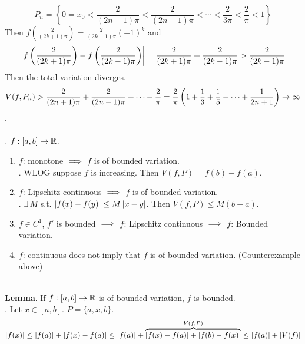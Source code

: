 $$P_n = \left\{0 = x_0 <\frac{2}{(2n+1)\pi} <\frac{2}{(2n-1)\pi} < \cdots < \frac{2}{3\pi} < \frac{2}{\pi} < 1 \right\}$$
Then $f(\frac{2}{(2k+1)\pi}) = \frac{2}{(2k+1)\pi} (-1)^k$ and $$\left|f\left(\frac{2}{(2k+1)\pi}\right) - f\left(\frac{2}{(2k-1)\pi}\right)\right| = \frac{2}{(2k+1)\pi} + \frac{2}{(2k-1)\pi} > \frac{2}{(2k-1)\pi}$$
Then the total variation diverges. $$V(f, P_n) > \frac{2}{(2n+1)\pi} + \frac{2}{(2n-1)\pi} + \cdots + \frac{2}{\pi} = \frac{2}{\pi} \left(1+\frac{1}{3} + \frac{1}{5} + \cdots + \frac{1}{2n+1}\right) \rightarrow \infty$$.\\
\\
\ex. $f:[a, b]\rightarrow\mathbb{R}$.
\begin{enumerate}
	\item $f$: monotone $\implies$ $f$ is of bounded variation.\\
	\pf. WLOG suppose $f$ is increasing. Then $V(f, P) = f(b)-f(a)$.
	\item $f$: Lipschitz continuous $\implies$ $f$ is of bounded variation.\\
	\pf. $\exists\, M$ s.t. $\left|f(x) - f(y)\right| \leq M\left|x-y\right|$. Then $V(f, P) \leq M(b-a)$.
	\item $f\in C^1$, $f'$ is bounded $\implies$ $f$: Lipschitz continuous $\implies $ $f$: Bounded variation.
	\item $f$: continuous does not imply that $f$ is of bounded variation. (Counterexample above)
\end{enumerate}~\\
\textbf{Lemma}. If $f:[a, b]\rightarrow\mathbb{R}$ is of bounded variation, $f$ is bounded.\\
\pf. Let $x\in[a, b]$. $P = \{a, x, b\}$.$$\left|f(x)\right| \leq \left|f(a)\right| + \left|f(x)-f(a)\right| \leq \left|f(a)\right| + \overbrace{\left|f(x) - f(a)\right| + \left|f(b)-f(x)\right|}^{V(f, P)} \leq \left|f(a)\right| + \left|V(f)\right|$$
\pagebreak